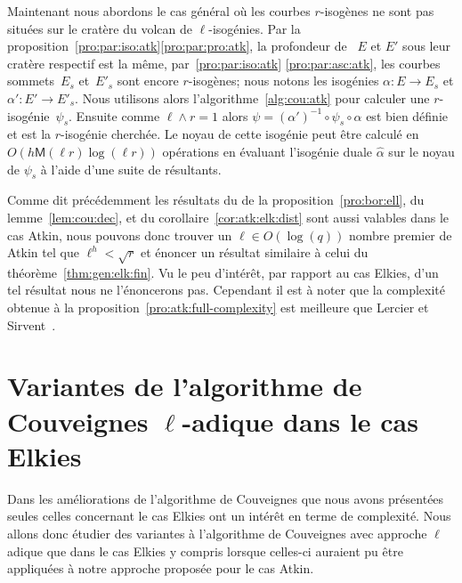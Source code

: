 \documentclass[10pt,a4paper]{book}
\theoremstyle{plain}
\newtheorem{thm}{Théorème}[chapter]
\theoremstyle{definition}
\theoremstyle{definition}
\theoremstyle{definition}
\theoremstyle{definition}
\theoremstyle{definition}
\theoremstyle{remark}
\theoremstyle{remark}
\theoremstyle{definition}
\begin{document}
Maintenant nous abordons le cas général où les courbes $r$-isogènes ne sont
pas situées sur le cratère du volcan de $\ell$-isogénies.
Par la proposition~\ref{pro:par:iso:atk}\eqref{pro:par:pro:atk}, la profondeur 
de ~$E$ et $E'$ sous leur cratère respectif est la même, 
par~\ref{pro:par:iso:atk} \eqref{pro:par:asc:atk}, les
courbes sommets~$E_{s}$ et~$E'_{s}$ sont encore $r$-isogènes; nous notons 
les isogénies $\alpha:E \rightarrow E_{s}$ et $\alpha':E' \rightarrow E'_{s}$. 
Nous utilisons alors l'algorithme~\ref{alg:cou:atk} pour calculer une 
$r$-isogénie~$\psi_{s}$. Ensuite comme $\ell \wedge r =1$ alors $\psi = 
(\alpha ')^{-1} \circ \psi_{s} \circ \alpha$ est bien définie et est la $r$-isogénie
cherchée. Le noyau de cette isogénie peut être calculé en $O(h\mathsf{M}(\ell r)\log(\ell r))$
opérations en évaluant l'isogénie duale $\widehat{\alpha}$ sur le noyau de 
$\psi_s$ à l'aide d'une suite de résultants. %

Comme dit précédemment les résultats du de la proposition~\ref{pro:bor:ell}, du
lemme~\ref{lem:cou:dec}, et du corollaire~\ref{cor:atk:elk:dist} sont 
aussi valables dans le cas Atkin, nous pouvons donc trouver un $\ell \in O(\log(q))$
nombre premier de Atkin tel que $\ell^h<\sqrt{r}$ et énoncer un résultat 
similaire à celui du théorème~\ref{thm:gen:elk:fin}. Vu le peu d'intérêt, par 
rapport au cas Elkies, d'un tel résultat nous ne l'énoncerons pas. Cependant il
est à noter que la complexité obtenue à la 
proposition~\ref{pro:atk:full-complexity} est meilleure que Lercier et 
Sirvent~\cite{Lercier-Sirvent2008}.



\chapter{Variantes de l'algorithme de Couveignes $\ell$-adique dans le cas Elkies}
\label{cha:var:cou}
Dans les améliorations de l'algorithme de Couveignes que nous avons présentées 
seules celles concernant le cas Elkies ont un intérêt en terme de complexité. 
Nous allons donc étudier des variantes à l'algorithme de Couveignes avec 
approche $\ell$ adique que dans le cas Elkies y compris lorsque celles-ci
auraient pu être appliquées à notre approche proposée pour le cas Atkin.
\end{document}
